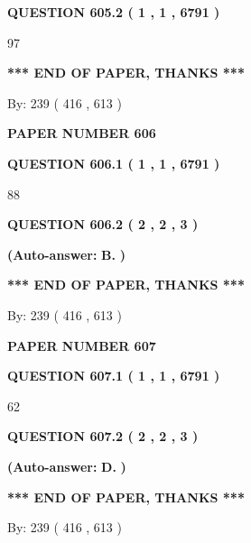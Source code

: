 \documentclass{ctexart}
\begin{document}
  
{\textbf{\large{QUESTION
605.2 
 ( 1 , 1 , 6791 )
}}}

97
   
   
   
   
\vspace{1.0in} 
{\textbf{\large{ *** END OF PAPER, THANKS *** }}} 
   
   
\hspace{1.0in} By: 
 239 ( 416 ,  613 )
   
   
   
   
\newpage 
\setcounter{page}{ 
   606001 } 
   
   
 {\textbf{ \Large{ PAPER NUMBER  606  }}}
   
   
   
   
  
  
{\textbf{\large{QUESTION
606.1 
 ( 1 , 1 , 6791 )
}}}

88
  
  
{\textbf{\large{QUESTION
606.2 
 ( 2 , 2 , 3 )
}}}
 
 
{\textbf{(Auto-answer:}}
{\textbf{\large{
B.}}}
{\textbf{)}}
 
 
   
   
   
   
\vspace{1.0in} 
{\textbf{\large{ *** END OF PAPER, THANKS *** }}} 
   
   
\hspace{1.0in} By: 
 239 ( 416 ,  613 )
   
   
   
   
\newpage 
\setcounter{page}{ 
   607001 } 
   
   
 {\textbf{ \Large{ PAPER NUMBER  607  }}}
   
   
   
   
  
  
{\textbf{\large{QUESTION
607.1 
 ( 1 , 1 , 6791 )
}}}

62
  
  
{\textbf{\large{QUESTION
607.2 
 ( 2 , 2 , 3 )
}}}
 
 
{\textbf{(Auto-answer:}}
{\textbf{\large{
D.}}}
{\textbf{)}}
 
 
   
   
   
   
\vspace{1.0in} 
{\textbf{\large{ *** END OF PAPER, THANKS *** }}} 
   
   
\hspace{1.0in} By: 
 239 ( 416 ,  613 )
   
   
   
\end{document}
